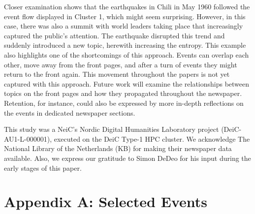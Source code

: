\documentclass[]{ceurart}
\begin{document}
Closer examination shows that the earthquakes in Chili in May 1960 followed the event flow displayed in Cluster 1, which might seem surprising. However, in this case, there was also a summit with world leaders taking place that increasingly captured the public's attention. The earthquake disrupted this trend and suddenly introduced a new topic, herewith increasing the entropy. 
This example also highlights one of the shortcomings of this approach. Events can overlap each other, move away from the front pages, and after a turn of events they might return to the front again. This movement throughout the papers is not yet captured with this approach. Future work will examine the relationships between topics on the front pages and how they propagated throughout the newspaper. Retention, for instance, could also be expressed by more in-depth reflections on the events in dedicated newspaper sections. 

\begin{acknowledgments}
This study was a NeiC's Nordic Digital Humanities Laboratory project (DeiC-AU1-L-000001), executed on the DeiC Type-1 HPC cluster. We acknowledge The National Library of the Netherlands (KB) for making their newspaper data available. Also, we express our gratitude to Simon DeDeo for his input during the early stages of this paper. 
\end{acknowledgments}



\appendix
\section{Appendix A: Selected Events}
\label{section:Appendix_A}

\end{document}
